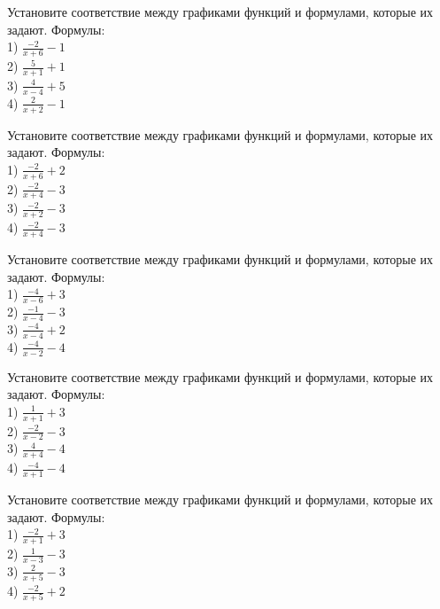 \documentclass[4apaper]{article}
\begin{document}
\begin{taskBN}{31}
Установите соответствие между графиками функций и формулами, которые их задают. Формулы: \\1) $\frac{-2}{x+6}-1$\\2) $\frac{5}{x+1}+1$\\3) $\frac{4}{x-4}+5$\\4) $\frac{2}{x+2}-1$
\end{taskBN}

\begin{taskBN}{32}
Установите соответствие между графиками функций и формулами, которые их задают. Формулы: \\1) $\frac{-2}{x+6}+2$\\2) $\frac{-2}{x+4}-3$\\3) $\frac{-2}{x+2}-3$\\4) $\frac{-2}{x+4}-3$
\end{taskBN}

\begin{taskBN}{33}
Установите соответствие между графиками функций и формулами, которые их задают. Формулы: \\1) $\frac{-4}{x-6}+3$\\2) $\frac{-1}{x-4}-3$\\3) $\frac{-4}{x-4}+2$\\4) $\frac{-4}{x-2}-4$
\end{taskBN}

\begin{taskBN}{34}
Установите соответствие между графиками функций и формулами, которые их задают. Формулы: \\1) $\frac{1}{x+1}+3$\\2) $\frac{-2}{x-2}-3$\\3) $\frac{4}{x+4}-4$\\4) $\frac{-4}{x+1}-4$
\end{taskBN}

\begin{taskBN}{35}
Установите соответствие между графиками функций и формулами, которые их задают. Формулы: \\1) $\frac{-2}{x+1}+3$\\2) $\frac{1}{x-3}-3$\\3) $\frac{2}{x+5}-3$\\4) $\frac{-2}{x+5}+2$
\end{taskBN}
\end{document}
